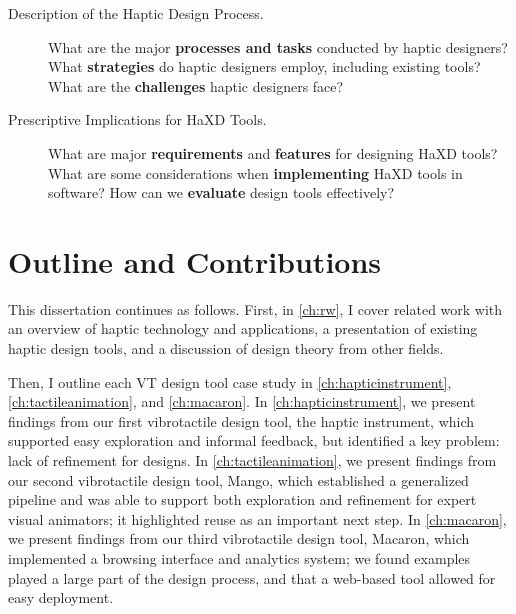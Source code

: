 \begin{description}
    \item[Description of the Haptic Design Process.]
    What are the major \textbf{processes and tasks} conducted by haptic designers?
    What \textbf{strategies} do haptic designers employ, including existing tools?
    What are the \textbf{challenges} haptic designers face?
    
    
    \item[Prescriptive Implications for HaXD Tools.]
    What are major \textbf{requirements} and \textbf{features} for designing HaXD tools?
    What are some considerations when \textbf{implementing} HaXD tools in software?
    How can we \textbf{evaluate} design tools effectively?
\end{description}


\section{Outline and Contributions}
This dissertation continues as follows.
First, in \autoref{ch:rw}, I cover related work with an overview of haptic technology and applications, a presentation of existing haptic design tools, and a discussion of design theory from other fields.

Then, I outline each VT design tool case study in \autoref{ch:hapticinstrument},  \autoref{ch:tactileanimation}, and \autoref{ch:macaron}.
In \autoref{ch:hapticinstrument}, we present findings from our first vibrotactile design tool, the haptic instrument, which supported easy exploration and informal feedback, but identified a key problem: lack of refinement for designs.
In \autoref{ch:tactileanimation}, we present findings from our second vibrotactile design tool, Mango, which established a generalized pipeline and was able to support both exploration and refinement for expert visual animators; it highlighted reuse as an important next step.
In \autoref{ch:macaron}, we present findings from our third vibrotactile design tool, Macaron, which implemented a browsing interface and analytics system; we found examples played a large part of the design process, and that a web-based tool allowed for easy deployment.

